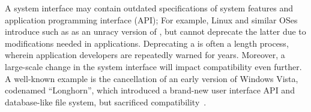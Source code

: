 A system interface may contain outdated specifications of system features and application programming interface (API);
For example, Linux and similar OSes
introduce \linuxapis{} such as  as an unracy version
of , but cannot deprecate the latter due to modifications needed in applications.
Deprecating a \linuxapi{} is often a length process, wherein application developers are repeatedly warned for years.
Moreover, a large-scale change in the system interface
will impact compatibility even further.
A well-known example is the cancellation of an early version of Windows Vista, 
codenamed ``Longhorn'',
which introduced a brand-new user interface API
and database-like file system, but sacrificed compatibility~\cite{spolsky04microsoft-api-war}.







